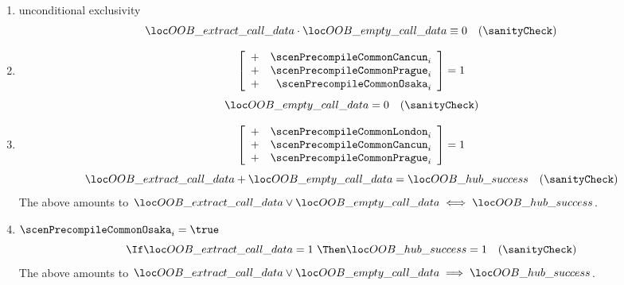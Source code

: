 \begin{description}
\begin{description}
\begin{enumerate}
\[\begin{array}{lclr}
							\end{array} \right.
						\]
						See section~(\ref{oob: populating: common precompiles}) for more details.
					\item unconditional exclusivity
						\[
							\locOobResultExtractCallData \cdot \locOobResultEmptyCallData \equiv 0
							\quad (\sanityCheck)
						\]
					\item\label{hub: instruction handling: call: precompiles: common: generalities: sanity checks for BLS precompiles and P256 Verify}
						\If
						\[
							\left[ \begin{array}{lr}
								+ & \scenPrecompileCommonCancun _{i} \\
								+ & \scenPrecompileCommonPrague _{i} \\
								+ & \scenPrecompileCommonOsaka  _{i} \\
							\end{array} \right]
							= 1
						\]
						\Then
						\[
							\locOobResultEmptyCallData = 0 \quad (\sanityCheck)
						\]
					\item\label{hub: instruction handling: call: precompiles: common: generalities: sanity checks for common prcs other than P256 Verify}
						\If
						\[
							\left[ \begin{array}{lr}
								+ & \scenPrecompileCommonLondon _{i} \\
								+ & \scenPrecompileCommonCancun _{i} \\
								+ & \scenPrecompileCommonPrague _{i} \\
							\end{array} \right]
							= 1
						\]
						\Then
						\[
							\locOobResultExtractCallData + \locOobResultEmptyCallData = \locOobResultHubSuccess
							\quad (\sanityCheck)
						\]
						\saNote{}
						The above amounts to $\locOobResultExtractCallData \vee \locOobResultEmptyCallData \iff \locOobResultHubSuccess$.
					\item\label{hub: instruction handling: call: precompiles: common: generalities: sanity checks for P256 Verify}
						\If $\scenPrecompileCommonOsaka  _{i} = \true$ \Then
						\[
							\If     \locOobResultExtractCallData = 1 ~ \Then \locOobResultHubSuccess = 1
							\quad (\sanityCheck)
						\]
						\saNote{}
						The above amounts to $\locOobResultExtractCallData \vee \locOobResultEmptyCallData \implies \locOobResultHubSuccess$.

\end{enumerate}
\end{description}
\end{description}
